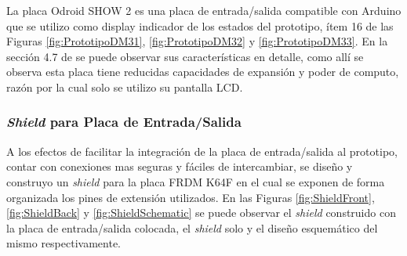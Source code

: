 \documentclass[withindex,glossary]{cam-thesis}
\begin{document}
La placa Odroid SHOW 2 es una placa de entrada/salida compatible con Arduino que se utilizo como display indicador de los estados del prototipo, ítem 16 de las Figuras \ref{fig:PrototipoDM31}, \ref{fig:PrototipoDM32} y \ref{fig:PrototipoDM33}. En la sección 4.7 de \cite{RASSOA} se puede observar sus características en detalle, como allí se observa esta placa tiene reducidas capacidades de expansión y poder de computo, razón por la cual solo se utilizo su pantalla LCD.

\subsubsection{\textit{Shield} para Placa de Entrada/Salida}
A los efectos de facilitar la integración de la placa de entrada/salida al prototipo, contar con conexiones mas seguras y fáciles de intercambiar, se diseño y construyo un \textit{shield} para la placa FRDM K64F en el cual se exponen de forma organizada los pines de extensión utilizados. En las Figuras \ref{fig:ShieldFront}, \ref{fig:ShieldBack} y \ref{fig:ShieldSchematic} se puede observar el \textit{shield} construido con la placa de entrada/salida colocada, el \textit{shield} solo y el diseño esquemático del mismo respectivamente.
\end{document}
